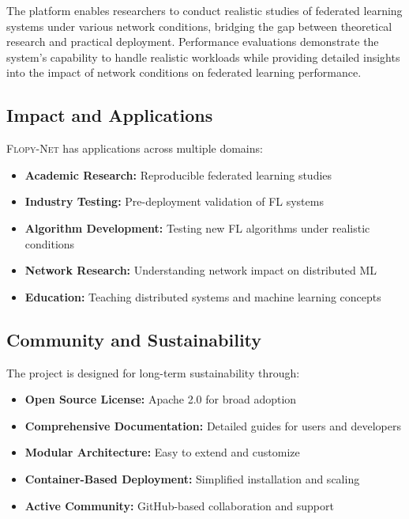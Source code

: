 \documentclass[12pt,a4paper,twoside]{article}
\newcommand{\flopynet}{\textsc{Flopy-Net}}
\begin{document}
The platform enables researchers to conduct realistic studies of federated learning systems under various network conditions, bridging the gap between theoretical research and practical deployment. Performance evaluations demonstrate the system's capability to handle realistic workloads while providing detailed insights into the impact of network conditions on federated learning performance.

\subsection{Impact and Applications}

\flopynet{} has applications across multiple domains:

\begin{itemize}
    \item \textbf{Academic Research:} Reproducible federated learning studies
    \item \textbf{Industry Testing:} Pre-deployment validation of FL systems
    \item \textbf{Algorithm Development:} Testing new FL algorithms under realistic conditions
    \item \textbf{Network Research:} Understanding network impact on distributed ML
    \item \textbf{Education:} Teaching distributed systems and machine learning concepts
\end{itemize}

\subsection{Community and Sustainability}

The project is designed for long-term sustainability through:

\begin{itemize}
    \item \textbf{Open Source License:} Apache 2.0 for broad adoption
    \item \textbf{Comprehensive Documentation:} Detailed guides for users and developers
    \item \textbf{Modular Architecture:} Easy to extend and customize
    \item \textbf{Container-Based Deployment:} Simplified installation and scaling
    \item \textbf{Active Community:} GitHub-based collaboration and support
\end{itemize}
\end{document}
